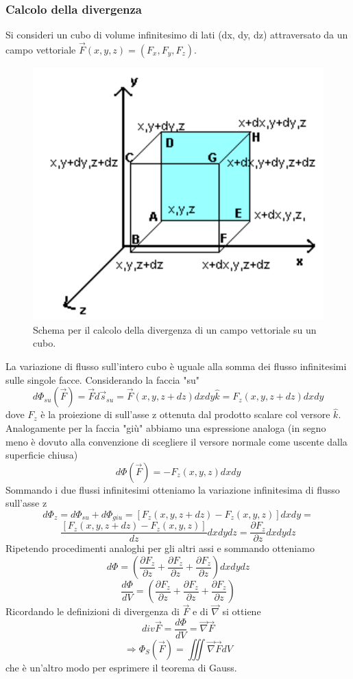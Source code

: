 \documentclass[10pt,a4paper]{article}
\begin{document}
\subsubsection{Calcolo della divergenza}
Si consideri un cubo di volume infinitesimo di lati (dx, dy, dz) attraversato da un campo vettoriale $\vec{F}(x,y,z) = (F_x, F_y, F_z)$.  
\begin{figure}[h!]
	\centering
	\includegraphics[width=0.6\linewidth]{images/div_quadrato}
	\caption{Schema per il calcolo della divergenza di un campo vettoriale su un cubo.}
	\label{fig:divquadrato}
\end{figure}
\FloatBarrier
La variazione di flusso sull'intero cubo è uguale alla somma dei flusso infinitesimi sulle singole facce. Considerando la faccia "su"
\[d\Phi_{su}(\vec{F}) = \vec{F}d\vec{s}_{su} = \vec{F}(x, y, z + dz)dxdy\hat{k}=F_z(x, y, z + dz)dxdy\]
dove \(F_z\) è la proiezione di sull'asse z ottenuta dal prodotto scalare col versore \(\hat{k}\). 
Analogamente per la faccia "giù" abbiamo una espressione analoga (in segno meno è dovuto alla convenzione di scegliere il versore normale come uscente dalla superficie chiusa)
\[d\Phi(\vec{F}) = -F_z(x, y, z)dxdy\]
Sommando i due flussi infinitesimi otteniamo la variazione infinitesima di flusso sull'asse z
\[d\Phi_z= d\Phi_{su}+d\Phi_{giu}=\left[F_z(x,y,z+dz)-F_z(x,y,z)\right]dxdy=\]
\[\frac{\left[F_z(x,y,z+dz)-F_z(x,y,z)\right]}{dz}dxdydz=\frac{\partial F_z}{\partial z}dxdydz\]
Ripetendo procedimenti analoghi per gli altri assi e sommando otteniamo
\[d\Phi = \left(\frac{\partial F_z}{\partial z}+ \frac{\partial F_z}{\partial z}+ \frac{\partial F_z}{\partial z}\right)dxdydz \]
\[\frac{d\Phi}{dV} = \left(\frac{\partial F_z}{\partial z}+ \frac{\partial F_z}{\partial z}+ \frac{\partial F_z}{\partial z}\right)\]
Ricordando le definizioni di divergenza di $\vec{F}$ e di \(\vec{\nabla}\) si ottiene
\[div\vec{F} = \frac{d\Phi}{dV} = \vec{\nabla}\vec{F}\]
\[\Rightarrow \Phi_S(\vec{F}) = \iiint \vec{\nabla}\vec{F}dV\]
che è un'altro modo per esprimere il teorema di Gauss.
\end{document}
